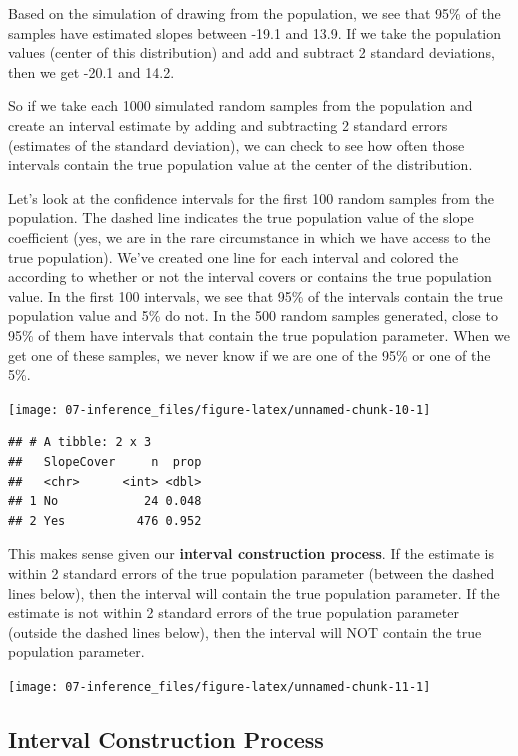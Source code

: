\documentclass[
]{book}
\begin{document}
Based on the simulation of drawing from the population, we see that 95\% of the samples have estimated slopes between -19.1 and 13.9. If we take the population values (center of this distribution) and add and subtract 2 standard deviations, then we get -20.1 and 14.2.

So if we take each 1000 simulated random samples from the population and create an interval estimate by adding and subtracting 2 standard errors (estimates of the standard deviation), we can check to see how often those intervals contain the true population value at the center of the distribution.

Let's look at the confidence intervals for the first 100 random samples from the population. The dashed line indicates the true population value of the slope coefficient (yes, we are in the rare circumstance in which we have access to the true population). We've created one line for each interval and colored the according to whether or not the interval covers or contains the true population value. In the first 100 intervals, we see that 95\% of the intervals contain the true population value and 5\% do not. In the 500 random samples generated, close to 95\% of them have intervals that contain the true population parameter. When we get one of these samples, we never know if we are one of the 95\% or one of the 5\%.

\begin{center}\texttt{[image: 07-inference\_files/figure-latex/unnamed-chunk-10-1]} \end{center}

\begin{verbatim}
## # A tibble: 2 x 3
##   SlopeCover     n  prop
##   <chr>      <int> <dbl>
## 1 No            24 0.048
## 2 Yes          476 0.952
\end{verbatim}

This makes sense given our \textbf{interval construction process}. If the estimate is within 2 standard errors of the true population parameter (between the dashed lines below), then the interval will contain the true population parameter. If the estimate is not within 2 standard errors of the true population parameter (outside the dashed lines below), then the interval will NOT contain the true population parameter.

\begin{center}\texttt{[image: 07-inference\_files/figure-latex/unnamed-chunk-11-1]} \end{center}

\subsection{Interval Construction Process}\label{interval-construction-process}
\end{document}
